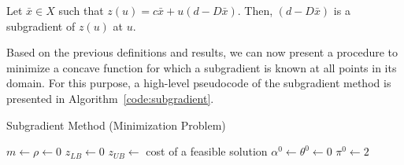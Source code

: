 \begin{proposition}
	Let $\bar{x} \in X$ such that $z(u) = c \bar{x} + u(d - D\bar{x})$. Then, $(d - D\bar{x})$ is a subgradient of $z(u)$ at $u$.
\end{proposition}

Based on the previous definitions and results, we can now present a procedure to
minimize a concave function for which a subgradient is known at all points in
its domain. For this purpose, a high-level pseudocode of the subgradient method
is presented in Algorithm~\ref{code:subgradient}.

\begin{algorithm}[!ht]
	\caption{\label{code:subgradient} Subgradient Method (Minimization Problem)}
	$m \leftarrow \rho \leftarrow 0$\;
	$z_{LB} \leftarrow 0$\;
	$z_{UB} \leftarrow$ cost of a feasible solution\;
	$\alpha^{0} \leftarrow \theta^{0} \leftarrow 0$\; $\pi^{0} \leftarrow 2$\;
	
\end{algorithm}


